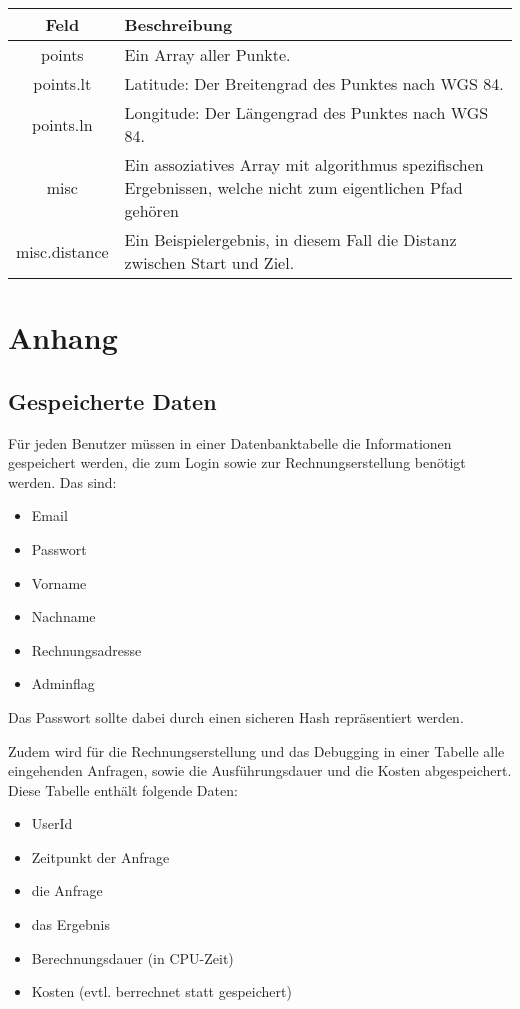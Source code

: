 \documentclass[ngerman,titlepage]{scrartcl}
\begin{document}
		\begin{tabular}{|c|p{12cm}|}
			\hline
			\textbf{Feld} & \textbf{Beschreibung} \\ 
			\hline \hline
			
			points & Ein Array aller Punkte.\\
			\hline
			
	    	points.lt & Latitude: Der Breitengrad des Punktes nach WGS 84. \\ 
	    	\hline
	    	
	    	points.ln & Longitude: Der Längengrad des Punktes nach WGS 84. \\
	    	\hline
	    	
	    	misc & Ein assoziatives Array mit algorithmus spezifischen Ergebnissen, welche nicht zum eigentlichen Pfad gehören \\
	    	\hline
	    	
	    	misc.distance & Ein Beispielergebnis, in diesem Fall die Distanz zwischen Start und Ziel.\\
	    	\hline
		\end{tabular}
	

\section{Anhang}

	\subsection{Gespeicherte Daten}
	
	Für jeden Benutzer müssen in einer Datenbanktabelle die Informationen gespeichert werden, die zum Login sowie zur Rechnungserstellung benötigt werden. 
	Das sind:
	
	\begin{itemize}
		\item Email
		\item Passwort
		\item Vorname
		\item Nachname
		\item Rechnungsadresse
		\item Adminflag
	\end{itemize}
	
	Das Passwort sollte dabei durch einen sicheren Hash repräsentiert werden.
	
	Zudem wird für die Rechnungserstellung und das Debugging in einer Tabelle alle eingehenden Anfragen, sowie die Ausführungsdauer und die Kosten abgespeichert.
	Diese Tabelle enthält folgende Daten:
	
	\begin{itemize}
		\item UserId
		\item Zeitpunkt der Anfrage
		\item die Anfrage
		\item das Ergebnis
		\item Berechnungsdauer (in CPU-Zeit)
		\item Kosten (evtl. berrechnet statt gespeichert)
	\end{itemize}	
\end{document}
